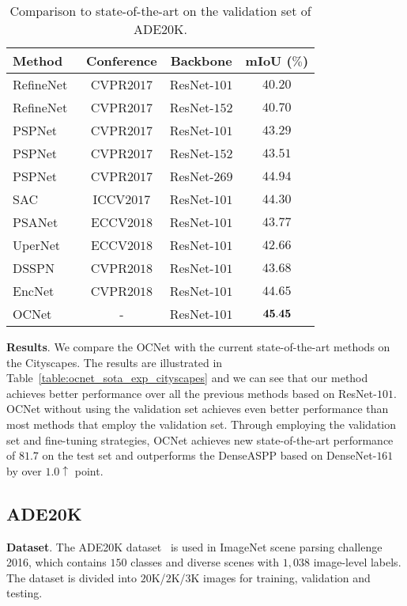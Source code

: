 \documentclass[10pt,twocolumn,letterpaper]{article}
\begin{document}
\begin{table}[htb]
\centering
\footnotesize
\caption{\small{Comparison to state-of-the-art on the validation set of ADE20K.}}
\begin{tabular}{l|c|c|c} \hline
Method & Conference & Backbone & mIoU ($\%$)  \\
\hline  
RefineNet~\cite{lin2017refinenet} &  CVPR$2017$  & ResNet-$101$  &  $40.20$ \\ 
RefineNet~\cite{lin2017refinenet} &  CVPR$2017$  & ResNet-$152$  & $40.70$\\ 
PSPNet~\cite{zhao2017pyramid}  &  CVPR$2017$  & ResNet-$101$  &  $43.29$ \\ 
PSPNet~\cite{zhao2017pyramid}  &  CVPR$2017$  & ResNet-$152$  &  $43.51$ \\ 
PSPNet~\cite{zhao2017pyramid}  &  CVPR$2017$  & ResNet-$269$  &  \underline{$44.94$} \\ 
SAC~\cite{Zhang_2017_ICCV}  &  ICCV$2017$  & ResNet-$101$  &  $44.30$ \\ 
PSANet~\cite{psanet} &  ECCV$2018$  & ResNet-$101$  &  $43.77$ \\ 
UperNet~\cite{xiao2018unified} &  ECCV$2018$  & ResNet-$101$  &  $42.66$ \\ 
DSSPN~\cite{Liang_2018_CVPR}  &  CVPR$2018$  & ResNet-$101$  &  $43.68$ \\ 
EncNet~\cite{Zhang_2018_CVPR}  &  CVPR$2018$  & ResNet-$101$  &  $44.65$ \\ 
OCNet & - &  ResNet-$101$ & $\bf{45.45}$ \\
\hline
\end{tabular}
\label{table:ocnet_sota_exp_ade20k}
\end{table}

\vspace{0.1cm}
\noindent\textbf{Results}.
We compare the OCNet with the current state-of-the-art methods on the Cityscapes.
The results are illustrated in Table~\ref{table:ocnet_sota_exp_cityscapes} and we can see that our method achieves better performance over all the previous methods based on ResNet-$101$. 
OCNet without using the validation set achieves even better performance than most methods that employ the validation set.
Through employing the validation set and fine-tuning strategies,
OCNet achieves new state-of-the-art performance of $81.7$ on the test set and outperforms
the DenseASPP based on DenseNet-$161$ by over $1.0 \uparrow $ point. 

\subsection{ADE20K}
\noindent\textbf{Dataset}.
The ADE20K dataset~\cite{zhou2017scene} is used in ImageNet scene parsing challenge 2016, which contains $150$ classes and diverse scenes with $1,038$ image-level labels.
The dataset is divided into $20$K/$2$K/$3$K images for training, validation and testing. 
\end{document}
